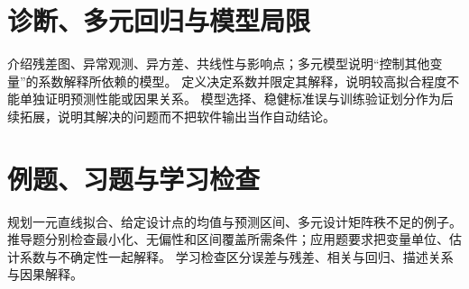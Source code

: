 \section{诊断、多元回归与模型局限}
\label{sec:ps-regression-diagnostics}
介绍残差图、异常观测、异方差、共线性与影响点；多元模型说明“控制其他变量”的系数解释所依赖的模型。
定义决定系数并限定其解释，说明较高拟合程度不能单独证明预测性能或因果关系。
模型选择、稳健标准误与训练验证划分作为后续拓展，说明其解决的问题而不把软件输出当作自动结论。

\section{例题、习题与学习检查}
规划一元直线拟合、给定设计点的均值与预测区间、多元设计矩阵秩不足的例子。
推导题分别检查最小化、无偏性和区间覆盖所需条件；应用题要求把变量单位、估计系数与不确定性一起解释。
学习检查区分误差与残差、相关与回归、描述关系与因果解释。







